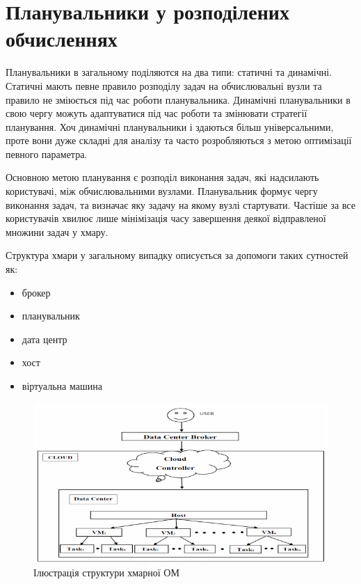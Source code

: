 \section{Планувальники у розподілених обчисленнях}

Планувальники в загальному поділяются на два типи: статичні та динамічні. Статичні мають певне правило розподілу задач на обчислювальні вузли та правило не зміюється під час роботи планувальника. Динамічні планувальники в свою чергу можуть адаптуватися під час роботи та змінювати стратегії планування. Хоч динамічні планувальники і здаються більш універсальними, проте вони дуже складні для аналізу та часто розробляються з метою оптимізації певного параметра.

Основною метою планування є розподіл виконання задач, які надсилають користувачі, між обчислювальними вузлами. Планувальник формує чергу виконання задач, та визначає яку задачу на якому вузлі стартувати. Частіше за все користувачів хвилює лише мінімізація часу завершення деякої відправленої множини задач у хмару.

Структура хмари у загальному випадку описується за допомоги таких сутностей як:
\begin{itemize}
	\item брокер
	\item планувальник
	\item дата центр
	\item хост
	\item віртуальна машина
\end{itemize}

\begin{figure}[H]
	\centering
	\includegraphics[width=\textwidth]{task_analysis/img/cloud_representation}
	\caption{Ілюстрація структури хмарної ОМ}
	\label{fig:cloud_representation}
\end{figure}

